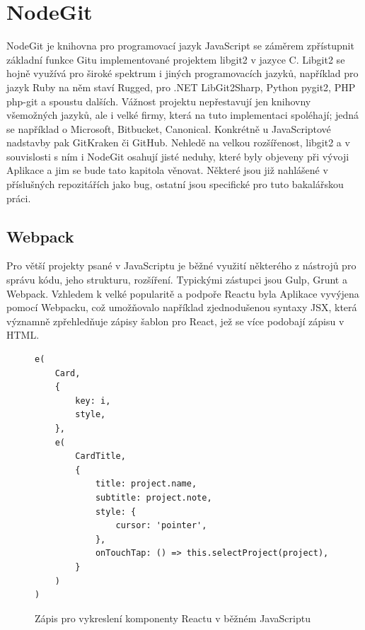 \chapter{NodeGit}

NodeGit je knihovna pro programovací jazyk JavaScript se záměrem zpřístupnit základní funkce Gitu implementované projektem libgit2 v jazyce C. Libgit2 se hojně využívá pro široké spektrum i jiných programovacích jazyků, například pro jazyk Ruby na něm staví Rugged, pro .NET LibGit2Sharp, Python pygit2, PHP php-git a spoustu dalších. Vážnost projektu nepřestavují jen knihovny všemožných jazyků, ale i velké firmy, která na tuto implementaci spoléhají; jedná se například o Microsoft, Bitbucket, Canonical. Konkrétně u JavaScriptové nadstavby pak GitKraken či GitHub. Nehledě na velkou rozšířenost, libgit2 a v souvislosti s ním i NodeGit osahují jisté neduhy, které byly objeveny při vývoji Aplikace a jim se bude tato kapitola věnovat. Některé jsou již nahlášené v příslušných repozitářích jako bug, ostatní jsou specifické pro tuto bakalářskou práci.

\section{Webpack}

Pro větší projekty psané v JavaScriptu je běžné využití některého z nástrojů pro správu kódu, jeho strukturu, rozšíření. Typickými zástupci jsou Gulp, Grunt a Webpack. Vzhledem k velké popularitě a podpoře Reactu byla Aplikace vyvýjena pomocí Webpacku, což umožňovalo například zjednodušenou syntaxy JSX, která významně zpřehledňuje zápisy šablon pro React, jež se více podobají zápisu v HTML.

\begin{figure}[h]
\begin{verbatim}
e(
	Card,
	{
		key: i,
		style,
	},
	e(
		CardTitle,
		{
			title: project.name,
			subtitle: project.note,
			style: {
				cursor: 'pointer',
			},
			onTouchTap: () => this.selectProject(project),
		}
	)
)
\end{verbatim}
\caption{Zápis pro vykreslení komponenty Reactu v běžném JavaScriptu}
\end{figure}

